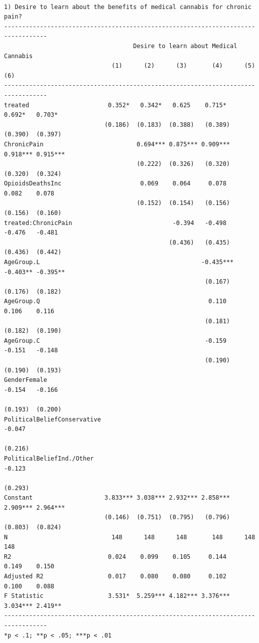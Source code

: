 \documentclass[
]{article}
\begin{document}
\begin{verbatim}

1) Desire to learn about the benefits of medical cannabis for chronic pain?
----------------------------------------------------------------------------------
                                    Desire to learn about Medical Cannabis        
                              (1)      (2)      (3)       (4)      (5)      (6)   
----------------------------------------------------------------------------------
treated                      0.352*   0.342*   0.625    0.715*    0.692*   0.703* 
                            (0.186)  (0.183)  (0.388)   (0.389)  (0.390)  (0.397) 
ChronicPain                          0.694*** 0.875*** 0.909***  0.918*** 0.915***
                                     (0.222)  (0.326)   (0.320)  (0.320)  (0.324) 
OpioidsDeathsInc                      0.069    0.064     0.078    0.082    0.078  
                                     (0.152)  (0.154)   (0.156)  (0.156)  (0.160) 
treated:ChronicPain                            -0.394   -0.498    -0.476   -0.481 
                                              (0.436)   (0.435)  (0.436)  (0.442) 
AgeGroup.L                                             -0.435*** -0.403** -0.395**
                                                        (0.167)  (0.176)  (0.182) 
AgeGroup.Q                                               0.110    0.106    0.116  
                                                        (0.181)  (0.182)  (0.190) 
AgeGroup.C                                              -0.159    -0.151   -0.148 
                                                        (0.190)  (0.190)  (0.193) 
GenderFemale                                                      -0.154   -0.166 
                                                                 (0.193)  (0.200) 
PoliticalBeliefConservative                                                -0.047 
                                                                          (0.216) 
PoliticalBeliefInd./Other                                                  -0.123 
                                                                          (0.293) 
Constant                    3.833*** 3.038*** 2.932*** 2.858***  2.909*** 2.964***
                            (0.146)  (0.751)  (0.795)   (0.796)  (0.803)  (0.824) 
N                             148      148      148       148      148      148   
R2                           0.024    0.099    0.105     0.144    0.149    0.150  
Adjusted R2                  0.017    0.080    0.080     0.102    0.100    0.088  
F Statistic                  3.531*  5.259*** 4.182*** 3.376***  3.034*** 2.419** 
----------------------------------------------------------------------------------
*p < .1; **p < .05; ***p < .01                                                    
\end{verbatim}
\end{document}
